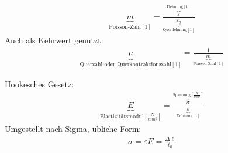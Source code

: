 \documentclass[11pt]{article}
\newcommand{\1}{ {\mathds{1}} }
\begin{document}
    \begin{align*}
        \underbrace{m}_{\text{Poisson-Zahl}[1]} = \frac{\overbrace{\varepsilon}^{\text{Dehnung} [1]}}{\underbrace{\varepsilon_q}_{\text{Querdehnung}[1]}}
    \end{align*}
    Auch als Kehrwert genutzt:
        \begin{align*}
        \underbrace{\mu}_{\text{Querzahl oder Querkontraktionszahl}[1]} = \frac{1}{\underbrace{m}_{\text{Poisson-Zahl}[1]}}
    \end{align*}
    \hrulefill
    
    Hookesches Gesetz:
    \begin{align*}
        \underbrace{E}_{\text{Elastizitätsmodul}\left[\frac{N}{mm^2}\right]}
        =
        \frac{\overbrace{\sigma}^{\text{Spannung}\left[\frac{N}{mm^2}\right]}}
        {\underbrace{\varepsilon}_{\text{Dehnung}\left[1\right]}}
    \end{align*}
Umgestellt nach Sigma, übliche Form:
    \begin{align*}
        \sigma
        =
        \varepsilon E
        =
        \frac{\Delta \ell}{\ell_0}
    \end{align*}
    \hrulefill

        
\end{document}
